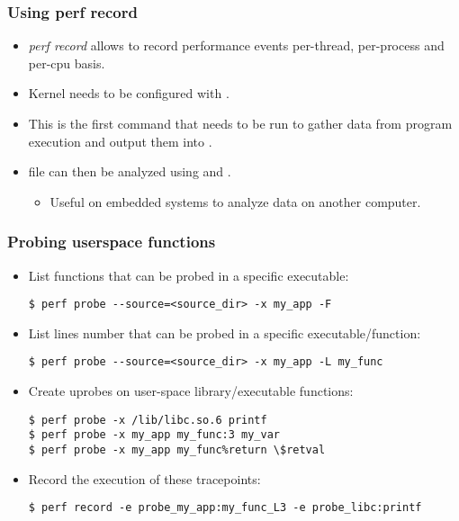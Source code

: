 \begin{frame}[fragile]
  \frametitle{Using perf record}
  \begin{itemize}
    \item {\em perf record} allows to record performance events per-thread,
          per-process and per-cpu basis.
    \item Kernel needs to be configured with .
    \item This is the first command that needs to be run to gather data from
          program execution and output them into .
    \item {} file can then be analyzed using 
          and .
    \begin{itemize}
      \item Useful on embedded systems to analyze data on another computer.
    \end{itemize}
  \end{itemize}
\end{frame}

\begin{frame}[fragile]
  \frametitle{Probing userspace functions}
  \begin{itemize}
    \item List functions that can be probed in a specific
          executable:
  \begin{block}{}
    \begin{verbatim}
$ perf probe --source=<source_dir> -x my_app -F
    \end{verbatim}
  \end{block}
    \item List lines number that can be probed in a specific
          executable/function:
  \begin{block}{}
    \begin{verbatim}
$ perf probe --source=<source_dir> -x my_app -L my_func
    \end{verbatim}
  \end{block}
    \item Create uprobes on user-space library/executable functions:
  \begin{block}{}
    \begin{verbatim}
$ perf probe -x /lib/libc.so.6 printf
$ perf probe -x my_app my_func:3 my_var
$ perf probe -x my_app my_func%return \$retval
    \end{verbatim}
  \end{block}
  \item Record the execution of these tracepoints:
  \begin{block}{}
    \begin{verbatim}
$ perf record -e probe_my_app:my_func_L3 -e probe_libc:printf
    \end{verbatim}
  \end{block}
  \end{itemize}
\end{frame}

